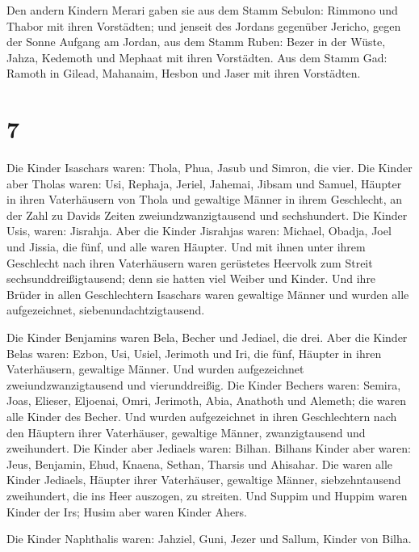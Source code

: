  Den andern Kindern Merari gaben sie aus dem Stamm Sebulon:
Rimmono und Thabor mit ihren Vorstädten;  und jenseit des
Jordans gegenüber Jericho, gegen der Sonne Aufgang am Jordan, aus dem
Stamm Ruben: Bezer in der Wüste, Jahza,  Kedemoth und
Mephaat mit ihren Vorstädten.  Aus dem Stamm Gad: Ramoth in
Gilead, Mahanaim,  Hesbon und Jaser mit ihren Vorstädten.

\hypertarget{section-6}{%
\section{7}\label{section-6}}

 Die Kinder Isaschars waren: Thola, Phua, Jasub und Simron,
die vier.  Die Kinder aber Tholas waren: Usi, Rephaja,
Jeriel, Jahemai, Jibsam und Samuel, Häupter in ihren Vaterhäusern von
Thola und gewaltige Männer in ihrem Geschlecht, an der Zahl zu Davids
Zeiten zweiundzwanzigtausend und sechshundert.  Die Kinder
Usis, waren: Jisrahja. Aber die Kinder Jisrahjas waren: Michael, Obadja,
Joel und Jissia, die fünf, und alle waren Häupter.  Und mit
ihnen unter ihrem Geschlecht nach ihren Vaterhäusern waren gerüstetes
Heervolk zum Streit sechsunddreißigtausend; denn sie hatten viel Weiber
und Kinder.  Und ihre Brüder in allen Geschlechtern
Isaschars waren gewaltige Männer und wurden alle aufgezeichnet,
siebenundachtzigtausend.

 Die Kinder Benjamins waren Bela, Becher und Jediael, die
drei.  Aber die Kinder Belas waren: Ezbon, Usi, Usiel,
Jerimoth und Iri, die fünf, Häupter in ihren Vaterhäusern, gewaltige
Männer. Und wurden aufgezeichnet zweiundzwanzigtausend und
vierunddreißig.  Die Kinder Bechers waren: Semira, Joas,
Elieser, Eljoenai, Omri, Jerimoth, Abia, Anathoth und Alemeth; die waren
alle Kinder des Becher.  Und wurden aufgezeichnet in ihren
Geschlechtern nach den Häuptern ihrer Vaterhäuser, gewaltige Männer,
zwanzigtausend und zweihundert.  Die Kinder aber Jediaels
waren: Bilhan. Bilhans Kinder aber waren: Jeus, Benjamin, Ehud, Knaena,
Sethan, Tharsis und Ahisahar.  Die waren alle Kinder
Jediaels, Häupter ihrer Vaterhäuser, gewaltige Männer, siebzehntausend
zweihundert, die ins Heer auszogen, zu streiten.  Und
Suppim und Huppim waren Kinder der Irs; Husim aber waren Kinder Ahers.

 Die Kinder Naphthalis waren: Jahziel, Guni, Jezer und
Sallum, Kinder von Bilha.

